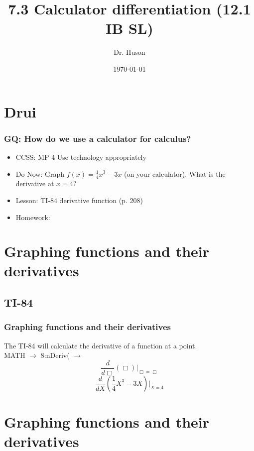 \documentclass{beamer}
\title{7.3 Calculator differentiation (12.1 IB SL)}
\author{Dr. Huson}
\date{\today}
\begin{document}
\frame{\titlepage}

\section[Outline]{}
\frame{\tableofcontents}

\section{Drui}
\frame
{
  \frametitle{GQ: How do we use a calculator for calculus?}

  \begin{itemize}
  \item CCSS: MP 4 Use technology appropriately
  \item Do Now: Graph $f(x)=\frac{1}{4}x^3-3x$ (on your calculator). What is the derivative at $x=4$?\\
  \item Lesson: TI-84 derivative function (p. 208)
  \item Homework:     
  \end{itemize}
}

\section{Graphing functions and their derivatives}
\subsection{TI-84}
\frame
{
  \frametitle{Graphing functions and their derivatives}
  The TI-84 will calculate the derivative of a function at a point.\\[10pt]
  MATH $\rightarrow$ 8:nDeriv( $\rightarrow$
  \[\frac{d}{d\Box}(\Box)|_{\Box=\Box}\]
  \[\frac{d}{dX}(\frac{1}{4}X^3-3X)|_{X=4}\]
}

\section{Graphing functions and their derivatives}
\end{document}
